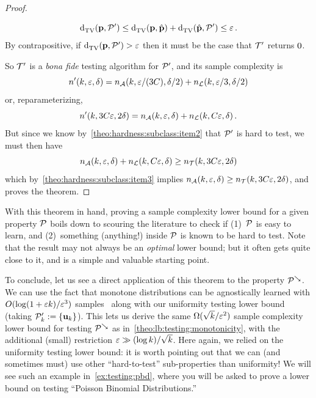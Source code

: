 \begin{proof}
\begin{itemize}
\[
	\totalvardist{\p}{\property'} \leq \totalvardist{\p}{\hat{\p}}+\totalvardist{\hat{\p}}{\property'} \leq \dst\,.
\]
By contrapositive, if $\totalvardist{\p}{\property'} > \dst$ then it must be the case that $\mathcal{T}'$ returns $0$.
\end{itemize}
So $\mathcal{T}'$ is a \textit{bona fide} testing algorithm for $\mathcal{P}'$, and its sample complexity is
\[
	n'(k,\varepsilon,\delta) = n_\mathcal{A}(k,\varepsilon/(3C),\delta/2) + n_{\mathcal{L}}(k,\varepsilon/3,\delta/2)
\]
or, reparameterizing, 
\[
	n'(k,3C\varepsilon,2\delta) = n_\mathcal{A}(k,\varepsilon,\delta) + n_{\mathcal{L}}(k,C\varepsilon,\delta)\,.
\]
But since we know by~\cref{theo:hardness:subclass:item2} that $\mathcal{P}'$ is hard to test, we must then have
\[
	n_\mathcal{A}(k,\varepsilon,\delta) + n_{\mathcal{L}}(k,C\varepsilon,\delta) \geq n_{\mathcal{T}}(k,3C\varepsilon,2\delta)
\]
which by~\cref{theo:hardness:subclass:item3} implies $n_\mathcal{A}(k,\varepsilon,\delta) \geq n_{\mathcal{T}}(k,3C\varepsilon,2\delta)$, and proves the theorem.
\end{proof}

With this theorem in hand, proving a sample complexity lower bound for a given property $\mathcal{P}$ boils down to scouring the literature to check if (1)~$\mathcal{P}$ is easy to learn, and (2)~something (anything!) inside $\mathcal{P}$ is known to be hard to test. Note that the result may not always be an \emph{optimal} lower bound; but it often gets quite close to it, and is a simple and valuable starting point.\smallskip

To conclude, let us see a direct application of this theorem to the property $\mathcal{P}^{\searrow}$. We can use the fact that monotone distributions can be agnostically learned with $O(\log(1+\varepsilon k)/\varepsilon^3)$ samples~\citep{Birge87,DDS:12} along with our uniformity testing lower bound (taking $\mathcal{P}'_k := \{\mathbf{u}_k\}$). This lets us derive the same $\Omega(\sqrt{k}/\varepsilon^2)$ sample complexity lower bound for testing $\mathcal{P}^{\searrow}$ as in~\cref{theo:lb:testing:monotonicity}, with the additional (small) restriction $\varepsilon \gg (\log k)/\sqrt{k}$. Here again, we relied on the uniformity testing lower bound: it is worth pointing out that we can (and sometimes must) use other ``hard-to-test'' sub-properties than uniformity! We will see such an example in~\cref{ex:testing:pbd}, where you will be asked to prove a lower bound on testing ``Poisson Binomial Distributions.''

